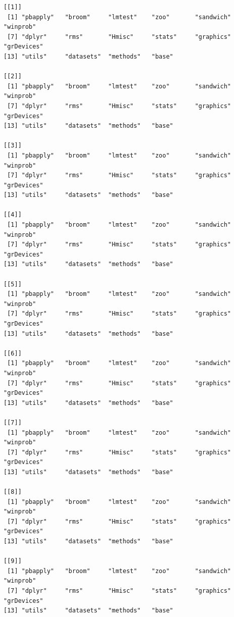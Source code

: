 \documentclass[
  letterpaper,
  DIV=11,
  numbers=noendperiod]{scrartcl}
\begin{document}
\begin{verbatim}
[[1]]
 [1] "pbapply"   "broom"     "lmtest"    "zoo"       "sandwich"  "winprob"  
 [7] "dplyr"     "rms"       "Hmisc"     "stats"     "graphics"  "grDevices"
[13] "utils"     "datasets"  "methods"   "base"     

[[2]]
 [1] "pbapply"   "broom"     "lmtest"    "zoo"       "sandwich"  "winprob"  
 [7] "dplyr"     "rms"       "Hmisc"     "stats"     "graphics"  "grDevices"
[13] "utils"     "datasets"  "methods"   "base"     

[[3]]
 [1] "pbapply"   "broom"     "lmtest"    "zoo"       "sandwich"  "winprob"  
 [7] "dplyr"     "rms"       "Hmisc"     "stats"     "graphics"  "grDevices"
[13] "utils"     "datasets"  "methods"   "base"     

[[4]]
 [1] "pbapply"   "broom"     "lmtest"    "zoo"       "sandwich"  "winprob"  
 [7] "dplyr"     "rms"       "Hmisc"     "stats"     "graphics"  "grDevices"
[13] "utils"     "datasets"  "methods"   "base"     

[[5]]
 [1] "pbapply"   "broom"     "lmtest"    "zoo"       "sandwich"  "winprob"  
 [7] "dplyr"     "rms"       "Hmisc"     "stats"     "graphics"  "grDevices"
[13] "utils"     "datasets"  "methods"   "base"     

[[6]]
 [1] "pbapply"   "broom"     "lmtest"    "zoo"       "sandwich"  "winprob"  
 [7] "dplyr"     "rms"       "Hmisc"     "stats"     "graphics"  "grDevices"
[13] "utils"     "datasets"  "methods"   "base"     

[[7]]
 [1] "pbapply"   "broom"     "lmtest"    "zoo"       "sandwich"  "winprob"  
 [7] "dplyr"     "rms"       "Hmisc"     "stats"     "graphics"  "grDevices"
[13] "utils"     "datasets"  "methods"   "base"     

[[8]]
 [1] "pbapply"   "broom"     "lmtest"    "zoo"       "sandwich"  "winprob"  
 [7] "dplyr"     "rms"       "Hmisc"     "stats"     "graphics"  "grDevices"
[13] "utils"     "datasets"  "methods"   "base"     

[[9]]
 [1] "pbapply"   "broom"     "lmtest"    "zoo"       "sandwich"  "winprob"  
 [7] "dplyr"     "rms"       "Hmisc"     "stats"     "graphics"  "grDevices"
[13] "utils"     "datasets"  "methods"   "base"     
\end{verbatim}
\end{document}
